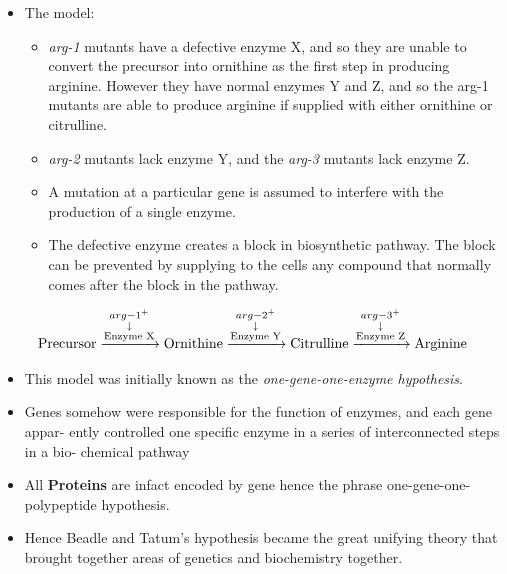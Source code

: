 \documentclass[11pt,dvipsnames,ignorenonframetext,aspectratio=169]{beamer}
\providecommand{\tightlist}{%
  \setlength{\itemsep}{0pt}\setlength{\parskip}{0pt}}
\begin{document}
\begin{frame}{}
\protect\hypertarget{section-10}{}
\begin{itemize}
\tightlist
\item
  The model:

  \begin{itemize}
  \tightlist
  \item
    \emph{arg-1} mutants have a defective enzyme X, and so they are
    unable to convert the precursor into ornithine as the first step in
    producing arginine. However they have normal enzymes Y and Z, and so
    the arg-1 mutants are able to produce arginine if supplied with
    either ornithine or citrulline.
  \item
    \emph{arg-2} mutants lack enzyme Y, and the \emph{arg-3} mutants
    lack enzyme Z.
  \item
    A mutation at a particular gene is assumed to interfere with the
    production of a single enzyme.
  \item
    The defective enzyme creates a block in biosynthetic pathway. The
    block can be prevented by supplying to the cells any compound that
    normally comes after the block in the pathway.
  \end{itemize}
\end{itemize}

\[
 \text{Precursor} \xrightarrow 
 {
 \begin{subarray}{c}
 arg-1^+ \\
 \downarrow \\
 \text{Enzyme X}
 \end{subarray}
 } 
 \text{Ornithine} \xrightarrow
  {
 \begin{subarray}{c}
  arg-2^+ \\
 \downarrow \\
 \text{Enzyme Y}
 \end{subarray}
 }
 \text{Citrulline} \xrightarrow
  {
 \begin{subarray}{c}
  arg-3^+ \\
 \downarrow \\
 \text{Enzyme Z}
 \end{subarray}
 }
 \text{Arginine}
\]
\end{frame}

\begin{frame}{}
\protect\hypertarget{section-11}{}
\begin{itemize}
\tightlist
\item
  This model was initially known as the \emph{one-gene-one-enzyme
  hypothesis}.
\item
  Genes somehow were responsible for the function of enzymes, and each
  gene appar- ently controlled one specific enzyme in a series of
  interconnected steps in a bio- chemical pathway
\item
  All \textbf{Proteins} are infact encoded by gene hence the phrase
  one-gene-one-polypeptide hypothesis.
\item
  Hence Beadle and Tatum's hypothesis became the great unifying theory
  that brought together areas of genetics and biochemistry together.
\end{itemize}
\end{frame}
\end{document}
